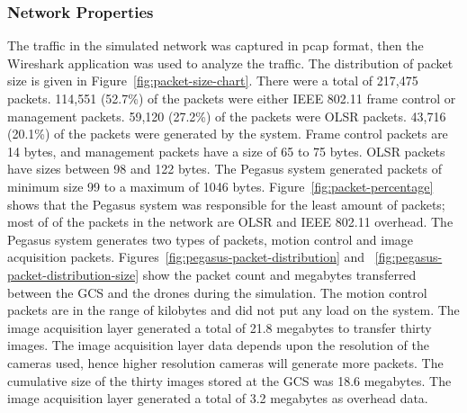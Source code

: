 \subsubsection{Network Properties}
The traffic in the simulated network was captured in pcap format, then the Wireshark application was used to analyze the traffic. The distribution of packet size is given in Figure~\ref{fig:packet-size-chart}. There were a total of 217,475 packets. 114,551 (52.7\%) of the packets were either IEEE 802.11 frame control or management packets. 59,120 (27.2\%) of the packets were OLSR packets. 43,716  (20.1\%) of the packets were generated by the system. Frame control packets are 14 bytes, and management packets have a size of 65 to 75 bytes. OLSR packets have sizes between 98 and 122 bytes. The Pegasus system generated packets of minimum size 99 to a maximum of 1046 bytes. Figure~\ref{fig:packet-percentage} shows that the Pegasus system was responsible for the least amount of packets; most of of the packets in the network are OLSR and IEEE 802.11 overhead.
The Pegasus system generates two types of packets, motion control and image acquisition packets.  Figures~\ref{fig:pegasus-packet-distribution} and ~\ref{fig:pegasus-packet-distribution-size} show the packet count and megabytes transferred between the GCS and the drones during the simulation. The motion control packets are in the range of kilobytes and did not put any load on the system. The image acquisition layer generated a total of 21.8 megabytes to transfer thirty images. The image acquisition layer data depends upon the resolution of the cameras used, hence higher resolution cameras will generate more packets. The cumulative size of the thirty images stored at the GCS was 18.6 megabytes. The image acquisition layer generated a total of 3.2 megabytes as overhead data.


